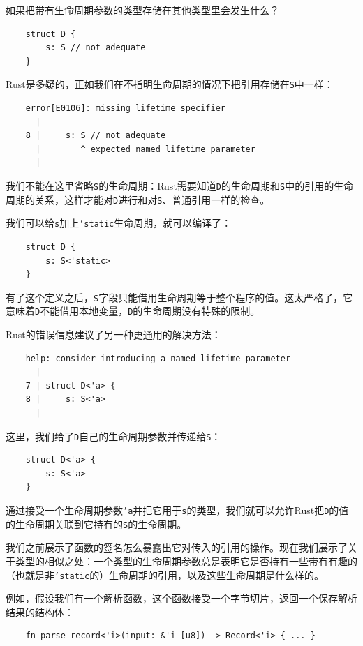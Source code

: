 如果把带有生命周期参数的类型存储在其他类型里会发生什么？
\begin{verbatim}
    struct D {
        s: S // not adequate
    }
\end{verbatim}

Rust是多疑的，正如我们在不指明生命周期的情况下把引用存储在\texttt{S}中一样：
\begin{verbatim}
    error[E0106]: missing lifetime specifier
      |
    8 |     s: S // not adequate
      |        ^ expected named lifetime parameter
      |
\end{verbatim}

我们不能在这里省略\texttt{S}的生命周期：Rust需要知道\texttt{D}的生命周期和\texttt{S}中的引用的生命周期的关系，这样才能对\texttt{D}进行和对\texttt{S}、普通引用一样的检查。

我们可以给\texttt{s}加上\texttt{'static}生命周期，就可以编译了：
\begin{verbatim}
    struct D {
        s: S<'static>
    }
\end{verbatim}

有了这个定义之后，\texttt{S}字段只能借用生命周期等于整个程序的值。这太严格了，它意味着\texttt{D}不能借用本地变量，\texttt{D}的生命周期没有特殊的限制。

Rust的错误信息建议了另一种更通用的解决方法：
\begin{verbatim}
    help: consider introducing a named lifetime parameter
      |
    7 | struct D<'a> {
    8 |     s: S<'a>
      |
\end{verbatim}

这里，我们给了\texttt{D}自己的生命周期参数并传递给\texttt{S}：
\begin{verbatim}
    struct D<'a> {
        s: S<'a>
    }
\end{verbatim}

通过接受一个生命周期参数\texttt{'a}并把它用于\texttt{s}的类型，我们就可以允许Rust把\texttt{D}的值的生命周期关联到它持有的\texttt{S}的生命周期。

我们之前展示了函数的签名怎么暴露出它对传入的引用的操作。现在我们展示了关于类型的相似之处：一个类型的生命周期参数总是表明它是否持有一些带有有趣的（也就是非\texttt{'static}的）生命周期的引用，以及这些生命周期是什么样的。

例如，假设我们有一个解析函数，这个函数接受一个字节切片，返回一个保存解析结果的结构体：
\begin{verbatim}
    fn parse_record<'i>(input: &'i [u8]) -> Record<'i> { ... }
\end{verbatim}


